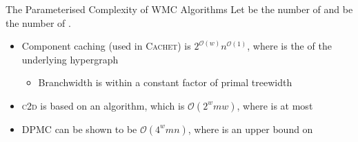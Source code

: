 \documentclass{beamer}
\begin{document}
\begin{frame}{The Parameterised Complexity of WMC Algorithms}
  Let  be the number of  and  be
  the number of .
  \begin{itemize}
    \item Component caching (used in \textsc{Cachet}) is
          \alert{$2^{\mathcal{O}(w)}n^{\mathcal{O}(1)}$}, where 
          is the  of the underlying hypergraph
          \textcolor{gray}{\parencite{DBLP:journals/jair/BacchusDP09}}
          \begin{itemize}
            \item Branchwidth is within a constant factor of primal treewidth
          \end{itemize}
    \item \textsc{c2d} is based on an algorithm, which is
          \alert{$\mathcal{O}(2^{w}mw)$}, where  is at most
          \textcolor{gray}{\parencite{DBLP:journals/jacm/Darwiche01,DBLP:conf/ecai/Darwiche04}}
    \item \textsc{DPMC} can be shown to be \alert{$\mathcal{O}(4^{w}mn)$}, where
           is an upper bound on 
  \end{itemize}
\end{frame}
\end{document}
